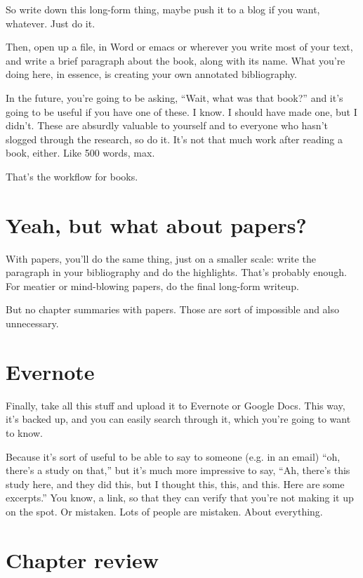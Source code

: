 So write down this long-form thing, maybe push it to a blog if you want,
whatever. Just do it.

Then, open up a file, in Word or emacs or wherever you write most of your text,
and write a brief paragraph about the book, along with its name. What you're
doing here, in essence, is creating your own annotated bibliography.

In the future, you're going to be asking, ``Wait, what was that book?'' and it's
going to be useful if you have one of these. I know. I should have made one, but
I didn't. These are absurdly valuable to yourself and to everyone who hasn't
slogged through the research, so do it. It's not that much work after reading a
book, either. Like 500 words, max.

That's the workflow for books.

\section{Yeah, but what about papers?}

With papers, you'll do the same thing, just on a smaller scale: write the
paragraph in your bibliography and do the highlights. That's probably
enough. For meatier or mind-blowing papers, do the final long-form writeup.

But no chapter summaries with papers. Those are sort of impossible and also
unnecessary.

\section{Evernote}

Finally, take all this stuff and upload it to Evernote or Google Docs. This way,
it's backed up, and you can easily search through it, which you're going to want
to know.

Because it's sort of useful to be able to say to someone (e.g. in an email)
``oh, there's a study on that,'' but it's much more impressive to say, ``Ah,
there's this study here, and they did this, but I thought this, this, and
this. Here are some excerpts.'' You know, a link, so that they can verify that you're not making it up
on the spot. Or mistaken. Lots of people are mistaken. About everything.


\section{Chapter review}

